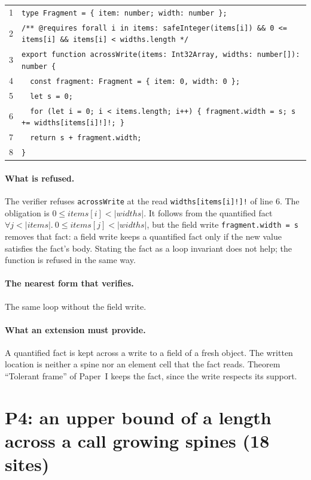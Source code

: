 \documentclass[10pt,a4paper]{article}
\theoremstyle{definition}
\theoremstyle{remark}
\newcommand{\len}[1]{|#1|}
\newcommand{\code}[1]{\texttt{#1}}
\newcommand{\entry}[1]{\paragraph{#1.}}
\begin{document}
{\footnotesize
\begin{tabular}{@{}r@{\hspace{1em}}l@{}}
1 & \code{type Fragment = \{ item: number; width: number \};} \\
2 & \code{/** @requires forall i in items: safeInteger(items[i]) \&\& 0 <= items[i] \&\& items[i] < widths.length */} \\
3 & \code{export function acrossWrite(items: Int32Array, widths: number[]): number \{} \\
4 & \code{~~const fragment: Fragment = \{ item: 0, width: 0 \};} \\
5 & \code{~~let s = 0;} \\
6 & \code{~~for (let i = 0; i < items.length; i++) \{ fragment.width = s; s += widths[items[i]!]!; \}} \\
7 & \code{~~return s + fragment.width;} \\
8 & \code{\}} \\
\end{tabular}}

\entry{What is refused} The verifier refuses \code{acrossWrite} at the read
\code{widths[items[i]!]!} of line 6. The obligation is
$0\le\mathit{items}[i]<\len{\mathit{widths}}$. It follows from the
quantified fact
$\forall j<\len{\mathit{items}}.\ 0\le\mathit{items}[j]<\len{\mathit{widths}}$,
but the field write \code{fragment.width = s} removes that fact: a
field write keeps a quantified fact only if the new value satisfies
the fact's body. Stating the fact as a loop
invariant does not help; the function is refused in the same way.

\entry{The nearest form that verifies} The same loop without the field write.

\entry{What an extension must provide} A quantified fact is kept across a write to a field of a
fresh object. The written location is neither a spine nor an element
cell that the fact reads. Theorem ``Tolerant frame'' of Paper~I keeps
the fact, since the write respects its support.

\section{P4: an upper bound of a length across a call growing spines (18 sites)}
\end{document}
